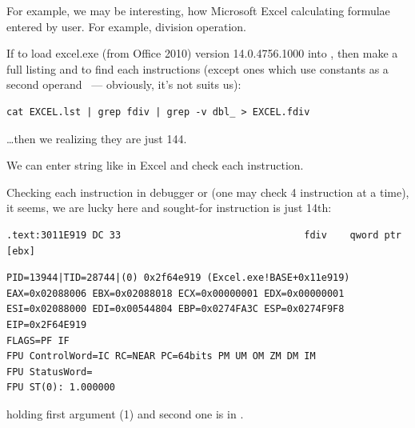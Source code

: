 {For example, we may be interesting, how Microsoft Excel calculating formulae entered by user.
For example, division operation.}

\index{\GrepUsage}
{If to load excel.exe (from Office 2010) version 14.0.4756.1000 into \IDA, then make a full listing
and to find each \FDIV instructions (except ones which use constants as a second 
operand ~--- obviously, it's not suits us):}

\begin{lstlisting}
cat EXCEL.lst | grep fdiv | grep -v dbl_ > EXCEL.fdiv
\end{lstlisting}

{\dots then we realizing they are just 144.}

{We can enter string like  in Excel and check each instruction.}

{Checking each instruction in debugger or \tracer
(one may check 4 instruction at a time),
it seems, we are lucky here and sought-for instruction is just 14th:}

\begin{lstlisting}
.text:3011E919 DC 33                                fdiv    qword ptr [ebx]
\end{lstlisting}

\begin{lstlisting}
PID=13944|TID=28744|(0) 0x2f64e919 (Excel.exe!BASE+0x11e919)
EAX=0x02088006 EBX=0x02088018 ECX=0x00000001 EDX=0x00000001
ESI=0x02088000 EDI=0x00544804 EBP=0x0274FA3C ESP=0x0274F9F8
EIP=0x2F64E919
FLAGS=PF IF
FPU ControlWord=IC RC=NEAR PC=64bits PM UM OM ZM DM IM 
FPU StatusWord=
FPU ST(0): 1.000000
\end{lstlisting}

{\STZERO holding first argument (1) and second one is in} \TT{[ebx]}.

